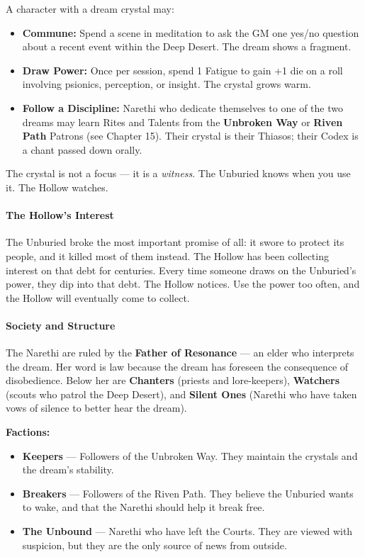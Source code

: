 A character with a dream crystal may:
\begin{itemize}
    \item \textbf{Commune:} Spend a scene in meditation to ask the GM one yes/no question about a recent event within the Deep Desert. The dream shows a fragment.
    \item \textbf{Draw Power:} Once per session, spend 1 Fatigue to gain +1 die on a roll involving psionics, perception, or insight. The crystal grows warm.
    \item \textbf{Follow a Discipline:} Narethi who dedicate themselves to one of the two dreams may learn Rites and Talents from the \textbf{Unbroken Way} or \textbf{Riven Path} Patrons (see Chapter 15). Their crystal is their Thiasos; their Codex is a chant passed down orally.
\end{itemize}

The crystal is not a focus --- it is a \textit{witness}. The Unburied knows when you use it. The Hollow watches.

\paragraph{The Hollow's Interest}
The Unburied broke the most important promise of all: it swore to protect its people, and it killed most of them instead. The Hollow has been collecting interest on that debt for centuries. Every time someone draws on the Unburied's power, they dip into that debt. The Hollow notices. Use the power too often, and the Hollow will eventually come to collect.

\paragraph{Society and Structure}
The Narethi are ruled by the \textbf{Father of Resonance} --- an elder who interprets the dream. Her word is law because the dream has foreseen the consequence of disobedience. Below her are \textbf{Chanters} (priests and lore-keepers), \textbf{Watchers} (scouts who patrol the Deep Desert), and \textbf{Silent Ones} (Narethi who have taken vows of silence to better hear the dream).

\textbf{Factions:}
\begin{itemize}
    \item \textbf{Keepers} --- Followers of the Unbroken Way. They maintain the crystals and the dream's stability.
    \item \textbf{Breakers} --- Followers of the Riven Path. They believe the Unburied wants to wake, and that the Narethi should help it break free.
    \item \textbf{The Unbound} --- Narethi who have left the Courts. They are viewed with suspicion, but they are the only source of news from outside.
\end{itemize}

